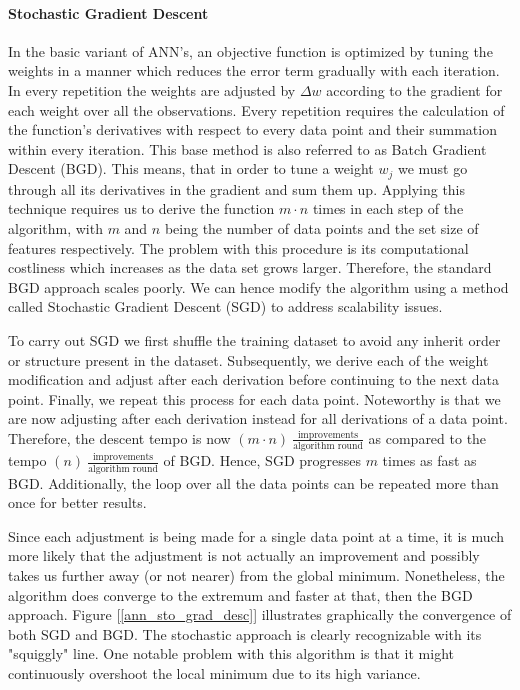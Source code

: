 	\paragraph{Stochastic Gradient Descent}
		In the basic variant of ANN's, an objective function is optimized by tuning the weights in a manner which reduces the error term gradually with each iteration. In every repetition the weights are adjusted by $ \Delta w $ according to the gradient for each weight over all the observations. Every repetition  requires the calculation of the function's derivatives with respect to every data point and their summation within every iteration. This base method is also referred to as Batch Gradient Descent (BGD). This means, that in order to tune a weight $ w_j $ we must go through all its derivatives in the gradient and sum them up.  Applying this technique requires us to derive the function $ m \cdot n $ times in each step of the algorithm, with $ m $ and $ n $ being the number of data points and the set size of features respectively. The problem with this procedure is its computational costliness which increases as the data set grows larger. Therefore, the standard BGD approach scales poorly. We can hence modify the algorithm using a method called Stochastic Gradient Descent (SGD) to address scalability issues.
		
		\par
	
		To carry out SGD we first shuffle the training dataset to avoid any inherit order or structure present in the dataset. Subsequently, we derive each of the weight modification and adjust after each derivation before continuing to the next data point. Finally, we repeat this process for each data point. Noteworthy is that we are now adjusting after each derivation instead for all derivations of a data point. Therefore, the descent tempo is now $ (m \cdot n) \ \frac{\text{improvements}}{\text{algorithm round}}$ as compared to the tempo $(n) \ \frac{\text{improvements}}{\text{algorithm round}}$ of BGD. Hence, SGD progresses $ m $ times as fast as BGD. Additionally, the loop over all the data points can be repeated more than once for better results.
		
		\par
		
		Since each adjustment is being made for a single data point at a time, it is much more likely that the adjustment is not actually an improvement and possibly takes us further away (or not nearer) from the global minimum. Nonetheless, the algorithm does converge to the extremum and faster at that, then the BGD approach.  Figure [\ref{ann_sto_grad_desc}] illustrates graphically the convergence of both SGD and BGD. The stochastic approach is clearly recognizable with its "squiggly" line. One notable problem with this algorithm is that it might continuously overshoot the local minimum due to its high variance.
		
